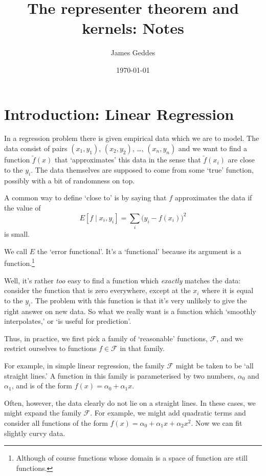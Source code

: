 \documentclass[11pt]{article}
\author{James Geddes}
\date{\today}
\title{The representer theorem and kernels: Notes}
\begin{document}
\maketitle

\section{Introduction: Linear Regression}
\label{sec:orgd50aef0}

In a regression problem there is given empirical data which we are to model. The
data consist of pairs \((x_1, y_1)\), \((x_2, y_2)\), \ldots{}, \((x_n, y_n)\) and we want
to find a function \(\tilde{f}(x)\) that `approximates' this data in the sense
that \(\tilde{f}(x_i)\) are close to the \(y_i\). The data themselves are supposed
to come from some `true' function, possibly with a bit of randomness on top.

A common way to define `close to' is by saying that \(f\) approximates the data if
the value of
\begin{equation*} 
E[f\mid x_i, y_i] = \sum_i \bigl(y_i - f(x_i)\bigr)^2
\end{equation*} 
is small. 

We call \(E\) the `error functional'. It's a `functional' because its argument is a
function.\footnote{Although of course functions whose domain is a space of function are
still functions.}

Well, it's rather \emph{too} easy to find a function which \emph{exactly} matches the
data: consider the function that is zero everywhere, except at the \(x_i\) where it
is equal to the \(y_i\). The problem with this function is that it's very unlikely
to give the right answer on new data. So what we really want is a function which
`smoothly interpolates,' or `is useful for prediction'.

Thus, in practice, we first pick a family of `reasonable' functions,
\(\mathcal{F}\), and we restrict ourselves to functions \(f\in\mathcal{F}\) in that
family.

For example, in simple linear regression, the family \(\mathcal{F}\) might be
taken to be `all straight lines.' A function in this family is parameterised by
two numbers, \(\alpha_0\) and \(\alpha_1\), and is of the form \(f(x) = \alpha_0 +
\alpha_1 x\).

Often, however, the data clearly do not lie on a straight lines. In these cases,
we might expand the family \(\mathcal{F}\). For example, we might add quadratic
terms and consider all functions of the form \(f(x) = \alpha_0 + \alpha_1 x +
\alpha_2 x^2\). Now we can fit slightly curvy data.
\end{document}
